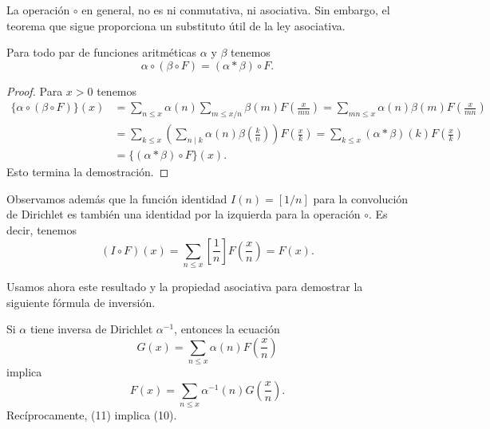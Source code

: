 \documentclass[12pt,a4paper]{book}
\begin{document}
    La operación $\circ$ en general, no es ni conmutativa, ni asociativa. Sin embargo, el
    teorema que sigue proporciona un substituto útil de la ley asociativa.

    \begin{teorema}
        Para todo par de funciones aritméticas $\alpha$ y $\beta$ tenemos
        \begin{equation}
            \alpha\circ(\beta\circ F)=(\alpha*\beta)\circ F.
        \end{equation}
    \end{teorema}

    \begin{proof}
        Para $x>0$ tenemos
        \begin{align*}
            \{\alpha\circ(\beta\circ F)\}(x)&=\sum_{n\leq x}\alpha(n)\sum_{m\leq x/n}
            \beta(m)F\left(\frac{x}{mn}\right)=\sum_{mn\leq x}\alpha(n)\beta(m)F\left(\frac{x}{mn}\right)\\
            &=\sum_{k\leq x}\left(\sum_{n\mid k}\alpha(n)\beta\left(\frac{k}{n}\right)\right)
            F\left(\frac{x}{k}\right)=\sum_{k\leq x}(\alpha*\beta)(k)F\left(\frac{x}{k}\right)\\
            &=\{(\alpha*\beta)\circ F\}(x).
        \end{align*}
        Esto termina la demostración.
    \end{proof}

    Observamos además que la función identidad $I(n)=[1/n]$ para la convolución de
    Dirichlet es también una identidad por la izquierda para la operación $\circ$. Es
    decir, tenemos
    \begin{equation*}
        (I\circ F)(x)=\sum_{n\leq x}\left[\frac{1}{n}\right]F\left(\frac{x}{n}\right)=F(x).
    \end{equation*}

    Usamos ahora este resultado y la propiedad asociativa para demostrar la siguiente
    fórmula de inversión.

    \begin{teorema}
        Si $\alpha$ tiene inversa de Dirichlet $\alpha^{-1}$, entonces la ecuación
        \begin{equation}
            G(x)=\sum_{n\leq x}\alpha(n)F\left(\frac{x}{n}\right)
        \end{equation}
        implica
        \begin{equation}
            F(x)=\sum_{n\leq x}\alpha^{-1}(n)G\left(\frac{x}{n}\right).
        \end{equation}
        Recíprocamente, (11) implica (10).
    \end{teorema}
\end{document}
